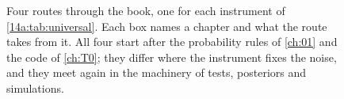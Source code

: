 \begin{figure}[htbp]
\caption{Four routes through the book, one for each instrument of
\cref{14a:tab:universal}. Each box names a chapter and what the route takes from it.
All four start after the probability rules of \cref{ch:01} and the code of
\cref{ch:T0}; they differ where the instrument fixes the noise, and they meet again in
the machinery of tests, posteriors and simulations.}
\label{14a:fig:routes}
\end{figure}

